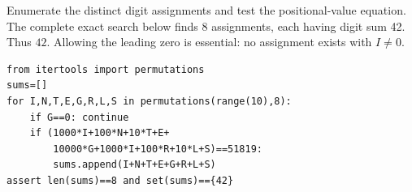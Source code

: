 Enumerate the distinct digit assignments and test the positional-value equation. The complete exact search below finds 8 assignments, each having digit sum 42. Thus $\boxed{42}$. Allowing the leading zero is essential: no assignment exists with $I\ne0$.
\begin{verbatim}
from itertools import permutations
sums=[]
for I,N,T,E,G,R,L,S in permutations(range(10),8):
    if G==0: continue
    if (1000*I+100*N+10*T+E+
        10000*G+1000*I+100*R+10*L+S)==51819:
        sums.append(I+N+T+E+G+R+L+S)
assert len(sums)==8 and set(sums)=={42}
\end{verbatim}
